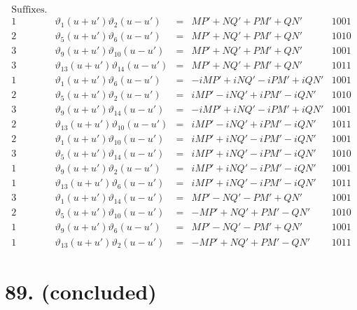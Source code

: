 \documentclass[11pt,a4paper]{article}
\newcommand{\uth}[1]{\vartheta_{#1}}
\begin{document}
\[
\begin{array}{ccccc}
\text{Suffixes.} & & & & \\
\hline
1 & \uth{1}(u+u')\uth{2}(u-u') &=& MP' + NQ' + PM' + QN' & 1001 \\
2 & \uth{5}(u+u')\uth{6}(u-u') &=& MP' + NQ' + PM' + QN' & 1010 \\
3 & \uth{9}(u+u')\uth{10}(u-u') &=& MP' + NQ' + PM' + QN' & 1001 \\
3 & \uth{13}(u+u')\uth{14}(u-u') &=& MP' + NQ' + PM' + QN' & 1011 \\
\hline
1 & \uth{1}(u+u')\uth{6}(u-u') &=& -iMP' + iNQ' - iPM' + iQN' & 1001 \\
2 & \uth{5}(u+u')\uth{2}(u-u') &=& iMP' - iNQ' + iPM' - iQN' & 1010 \\
3 & \uth{9}(u+u')\uth{14}(u-u') &=& -iMP' + iNQ' - iPM' + iQN' & 1001 \\
2 & \uth{13}(u+u')\uth{10}(u-u') &=& iMP' - iNQ' + iPM' - iQN' & 1011 \\
\hline
2 & \uth{1}(u+u')\uth{10}(u-u') &=& iMP' + iNQ' - iPM' - iQN' & 1001 \\
3 & \uth{5}(u+u')\uth{14}(u-u') &=& iMP' + iNQ' - iPM' - iQN' & 1010 \\
1 & \uth{9}(u+u')\uth{2}(u-u') &=& iMP' + iNQ' - iPM' - iQN' & 1001 \\
1 & \uth{13}(u+u')\uth{6}(u-u') &=& iMP' + iNQ' - iPM' - iQN' & 1011 \\
\hline
3 & \uth{1}(u+u')\uth{14}(u-u') &=& MP' - NQ' - PM' + QN' & 1001 \\
2 & \uth{5}(u+u')\uth{10}(u-u') &=& -MP' + NQ' + PM' - QN' & 1010 \\
1 & \uth{9}(u+u')\uth{6}(u-u') &=& MP' - NQ' - PM' + QN' & 1001 \\
1 & \uth{13}(u+u')\uth{2}(u-u') &=& -MP' + NQ' + PM' - QN' & 1011
\end{array}
\]

\newpage
\section*{89. (concluded)}
\label{sec:89conc}
\end{document}
